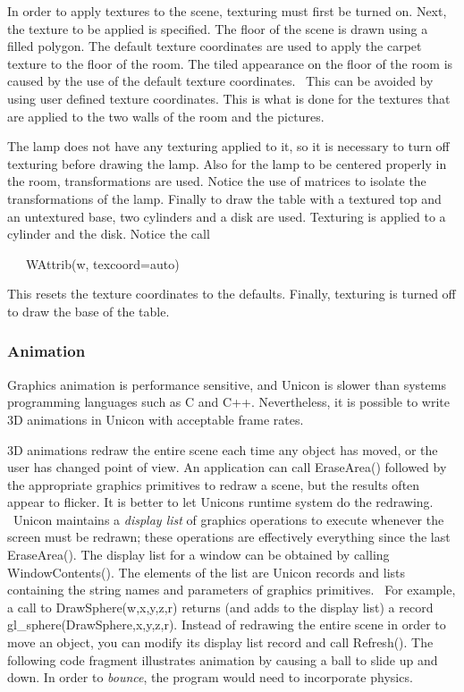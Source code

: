 In order to apply textures to the scene, texturing must first be turned
on. Next, the texture to be applied is specified. The floor of the
scene is drawn using a filled polygon. The default texture coordinates
are used to apply the carpet texture to the floor of the room. The
tiled appearance on the floor of the room is caused by the use of the
default texture coordinates. \ This can be avoided by using user
defined texture coordinates. This is what is done for the textures that
are applied to the two walls of the room and the pictures. 

The lamp does not have any texturing applied to it, so it is necessary
to turn off texturing before drawing the lamp. Also for the lamp to be
centered properly in the room, transformations are used. Notice the use
of matrices to isolate the transformations of the lamp. Finally to draw
the table with a textured top and an untextured base, two cylinders and
a disk are used. Texturing is applied to a cylinder and the disk.
Notice the call 

\ \ \ WAttrib(w, {\textquotedbl}texcoord=auto{\textquotedbl})

This resets the texture coordinates to the defaults. Finally, texturing
is turned off to draw the base of the table.

\subsubsection{Animation}

Graphics animation is performance sensitive, and Unicon is slower than
systems programming languages such as C and C++. Nevertheless, it is
possible to write 3D animations in Unicon with acceptable frame rates.

3D animations redraw the entire scene each time any object has moved, or
the user has changed point of view. An application can call EraseArea()
followed by the appropriate graphics primitives to redraw a scene, but
the results often appear to flicker. It is better to let
Unicon{\textquotesingle}s runtime system do the redrawing. \ Unicon
maintains a \textit{display list} of graphics operations to execute
whenever the screen must be redrawn; these operations are effectively
everything since the last EraseArea(). The display list for a window
can be obtained by calling WindowContents(). The elements of the list
are Unicon records and lists containing the string names and parameters
of graphics primitives. \ For example, a call to DrawSphere(w,x,y,z,r)
returns (and adds to the display list) a record
gl\_sphere({\textquotedbl}DrawSphere{\textquotedbl},x,y,z,r). Instead
of redrawing the entire scene in order to move an object, you can
modify its display list record and call Refresh(). The following code
fragment illustrates animation by causing a ball to slide up and down.
In order to \textit{bounce}, the program would need to incorporate
physics. 

